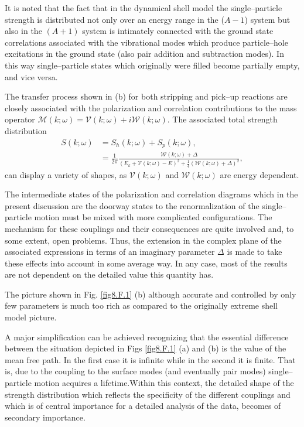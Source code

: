 \begin{subappendices}
It is noted that the fact that in the dynamical shell model the single--particle strength is distributed not only over an energy range in the ($A-1$) system but also in the $(A+1)$ system is intimately connected with the ground state correlations associated with the vibrational modes which produce particle--hole excitations in the ground state (also pair addition and subtraction modes). In this way single--particle states which originally were filled become partially empty, and vice versa.


The transfer process shown in (b) for both stripping and pick--up reactions are closely associated with the polarization and correlation contributions to the mass operator $\mathcal M(k;\omega)=\mathcal V(k;\omega)+i\mathcal W(k;\omega)$. The associated total strength distribution
 \begin{align}
 \nonumber S(k;\omega)&=S_h(k;\omega)+S_p(k;\omega),\\
 &=\frac{1}{2\pi}\frac{\mathcal W(k;\omega)+\Delta}{(E_k+\mathcal V(k;\omega)-E)^2+\frac{1}{4}\left(\mathcal W(k;\omega)+\Delta\right)^2},
 \end{align}
can display a variety of shapes, as $\mathcal V(k;\omega)$ and $\mathcal W(k;\omega)$ are energy dependent.


The intermediate states of the polarization and correlation diagrams which in the present discussion are the doorway states to the renormalization of the single--particle motion must be mixed with more complicated configurations. The mechanism for these couplings and their consequences are quite involved and, to some extent, open problems. Thus, the extension in the complex plane of the associated expressions in terms of an imaginary parameter $\Delta$ is made to take these effects into account in some average way. In any case, most of the results are not dependent on the detailed value this quantity has. 


The picture shown in Fig. \ref{fig8.F.1} (b) although accurate and controlled by only few parameters is much too rich as compared to the originally extreme shell model picture.


A major simplification can be achieved recognizing that the essential difference between the situation depicted in Figs \ref{fig8.F.1} (a) and (b) is the value of the mean free path. In the first case it is infinite while in the second it is finite. That is, due to the coupling to the surface modes (and eventually pair modes) single--particle motion acquires a lifetime.Within this context, the detailed shape of the strength distribution which reflects the specificity of the different couplings and which is of central importance for a detailed analysis of the data, becomes of secondary importance. 


\end{subappendices}
